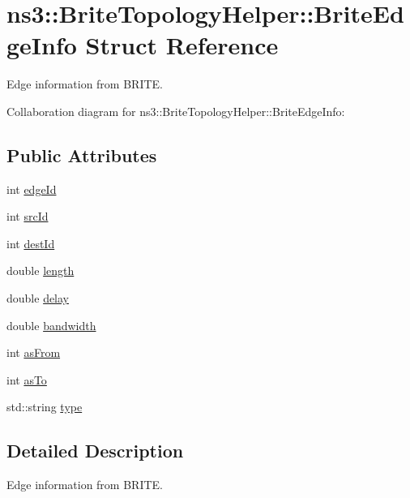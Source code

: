 \hypertarget{structns3_1_1BriteTopologyHelper_1_1BriteEdgeInfo}{}\section{ns3\+:\+:Brite\+Topology\+Helper\+:\+:Brite\+Edge\+Info Struct Reference}
\label{structns3_1_1BriteTopologyHelper_1_1BriteEdgeInfo}


Edge information from B\+R\+I\+TE.  




Collaboration diagram for ns3\+:\+:Brite\+Topology\+Helper\+:\+:Brite\+Edge\+Info\+:
\subsection*{Public Attributes}
\begin{DoxyCompactItemize}
\item 
int \hyperlink{structns3_1_1BriteTopologyHelper_1_1BriteEdgeInfo_a0b750b04d5efb7bfdcba7bc20e563e19}{edge\+Id}
\item 
int \hyperlink{structns3_1_1BriteTopologyHelper_1_1BriteEdgeInfo_a7ce9b61320a3b6118e4feb7789d04f38}{src\+Id}
\item 
int \hyperlink{structns3_1_1BriteTopologyHelper_1_1BriteEdgeInfo_a7b100defc607158245a6c3d2a13f5267}{dest\+Id}
\item 
double \hyperlink{structns3_1_1BriteTopologyHelper_1_1BriteEdgeInfo_a708975cee713c1176baa51901c54ab69}{length}
\item 
double \hyperlink{structns3_1_1BriteTopologyHelper_1_1BriteEdgeInfo_a2a8ae4bd915fc3395859df4f84f94dd0}{delay}
\item 
double \hyperlink{structns3_1_1BriteTopologyHelper_1_1BriteEdgeInfo_a7e628c84f8b854d2ac4b2adf7bc188dd}{bandwidth}
\item 
int \hyperlink{structns3_1_1BriteTopologyHelper_1_1BriteEdgeInfo_a2f856b00b73039a20bff98fdfbbdf924}{as\+From}
\item 
int \hyperlink{structns3_1_1BriteTopologyHelper_1_1BriteEdgeInfo_aa078e9508d7ef89351ed583bb9fadf45}{as\+To}
\item 
std\+::string \hyperlink{structns3_1_1BriteTopologyHelper_1_1BriteEdgeInfo_a6e79272701be217cc51d544c0e5aa82c}{type}
\end{DoxyCompactItemize}


\subsection{Detailed Description}
Edge information from B\+R\+I\+TE. 

